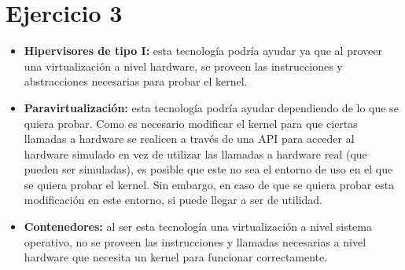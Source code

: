 \documentclass[11pt]{article}
\begin{document}
\section*{Ejercicio 3}
\begin{itemize}
  \item \textbf{Hipervisores de tipo I:} esta tecnología podría ayudar ya
  que al proveer una virtualización a nivel hardware, se proveen las instrucciones
  y abstracciones necesarias para probar el kernel.
  \item \textbf{Paravirtualización:} esta tecnología podría ayudar dependiendo 
  de lo que se quiera probar. Como es necesario modificar el kernel para
  que ciertas llamadas a hardware se realicen a través de una API
  para acceder al hardware simulado en vez de utilizar las llamadas a hardware
  real (que pueden ser simuladas), es posible que este no sea el entorno de uso
  en el que se quiera probar el kernel. Sin embargo, en caso de que se quiera probar
  esta modificación en este entorno, si puede llegar a ser de utilidad.
  \item \textbf{Contenedores:} al ser esta tecnología una virtualización a nivel
  sistema operativo, no se proveen las instrucciones y llamadas necesarias a 
  nivel hardware que necesita un kernel para funcionar correctamente.
\end{itemize}
\end{document}
